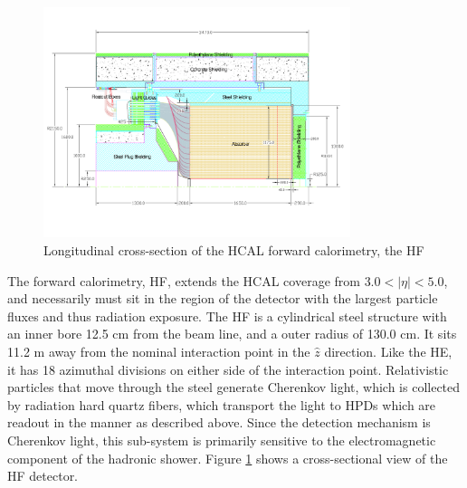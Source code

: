 \begin{figure}[h]
   \centering
  \includegraphics[width=0.8\textwidth]{Figures/CMS_Diagrams/HCAL__HF_layout.pdf}
  \caption{Longitudinal cross-section of the HCAL forward calorimetry,
  the HF} \label{fig:hcal_hf_layout}
\end{figure}

\par The forward calorimetry, HF, extends the HCAL coverage from
$3.0<|\eta|<5.0$, and necessarily must sit in the region of the
detector with the largest particle fluxes and thus radiation
exposure.  The HF is a cylindrical steel structure with an inner bore
12.5 cm from the beam line, and a outer radius of 130.0 cm.  It sits
11.2 m  away from the nominal interaction point in the $\hat{z}$
direction.  Like the HE, it has 18 azimuthal divisions on either side
of the interaction point.  Relativistic particles that move through
the steel generate Cherenkov light, which is collected by radiation
hard quartz fibers, which transport the light to HPDs which are
readout in the manner as described above.  Since the detection
mechanism is Cherenkov light, this sub-system is primarily sensitive to
the electromagnetic component of the hadronic shower.  Figure
\ref{fig:hcal_hf_layout} shows a cross-sectional view of the HF
detector.   

%
%
%
%

